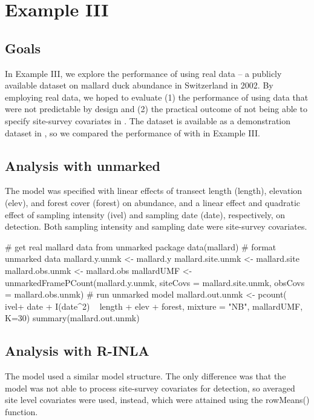 \documentclass[article]{jss}
\begin{document}
\section[Example III]{Example III}
\subsection[Goals]{Goals}
In Example III, we explore the performance of  using real data -- a publicly available dataset on mallard duck abundance in Switzerland in 2002.  By employing real data, we hoped to evaluate (1) the performance of  using data that were not predictable by design and (2) the practical outcome of not being able to specify site-survey covariates in .  The dataset is available as a demonstration dataset in , so we compared the performance of  with  in Example III.

\subsection[Analysis with unmarked]{Analysis with unmarked}
The  model was specified with linear effects of transect length (length), elevation (elev), and forest cover (forest) on abundance, and a linear effect and quadratic effect of sampling intensity (ivel) and sampling date (date), respectively, on detection.  Both sampling intensity and sampling date were site-survey covariates.

\begin{Code}
# get real mallard data from unmarked package
data(mallard)
# format unmarked data
mallard.y.unmk <- mallard.y
mallard.site.unmk <- mallard.site
mallard.obs.unmk <- mallard.obs
mallardUMF <- unmarkedFramePCount(mallard.y.unmk, siteCovs = mallard.site.unmk,
                                  obsCovs = mallard.obs.unmk)
# run unmarked model
mallard.out.unmk <- pcount(~ ivel+ date + I(date^2) ~ length + elev + forest,
                           mixture = "NB", mallardUMF, K=30)
summary(mallard.out.unmk)
\end{Code}

\subsection[Analysis with R-INLA]{Analysis with R-INLA}
The  model used a similar model structure.  The only difference was that the  model was not able to process site-survey covariates for detection, so averaged site level covariates were used, instead, which were attained using the rowMeans() function.
\end{document}
